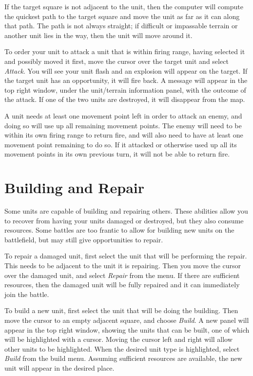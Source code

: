 If the target square is not adjacent to the unit, then the computer will compute the quickest path to the target square and move the unit as far as it can along that path. The path is not always straight; if difficult or impassable terrain or another unit lies in the way, then the unit will move around it.

To order your unit to attack a unit that is within firing range, having selected it and possibly moved it first, move the cursor over the target unit and select {\it Attack}. You will see your unit flash and an explosion will appear on the target. If the target unit has an opportunity, it will fire back. A message will appear in the top right window, under the unit/terrain information panel, with the outcome of the attack. If one of the two units are destroyed, it will disappear from the map.

A unit needs at least one movement point left in order to attack an enemy, and doing so will use up all remaining movement points. The enemy will need to be within its own firing range to return fire, and will also need to have at least one movement point remaining to do so. If it attacked or otherwise used up all its movement points in its own previous turn, it will not be able to return fire.

\section{Building and Repair}

\noindent
Some units are capable of building and repairing others. These abilities allow you to recover from having your units damaged or destroyed, but they also consume resources. Some battles are too frantic to allow for building new units on the battlefield, but may still give opportunities to repair.

To repair a damaged unit, first select the unit that will be performing the repair. This needs to be adjacent to the unit it is repairing. Then you move the cursor over the damaged unit, and select {\it Repair} from the menu. If there are sufficient resources, then the damaged unit will be fully repaired and it can immediately join the battle.

To build a new unit, first select the unit that will be doing the building. Then move the cursor to an empty adjacent square, and choose {\it Build}. A new panel will appear in the top right window, showing the units that can be built, one of which will be highlighted with a cursor. Moving the cursor left and right will allow other units to be highlighted. When the desired unit type is highlighted, select {\it Build} from the build menu. Assuming sufficient resources are available, the new unit will appear in the desired place.

